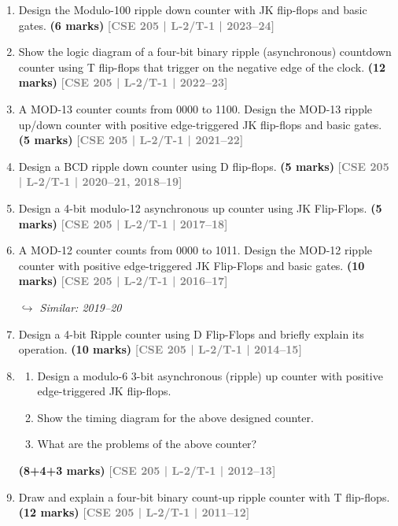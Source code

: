 \documentclass[12pt]{article}
\newcommand{\yr}[1]{\hfill\textcolor{gray}{\small\textbf{[#1]}}}
\newcommand{\mk}[1]{\textcolor{orange!70!black}{\small\textbf{(#1 marks)}}}
\newcommand{\variant}[1]{\par\vspace{1pt}\textcolor{blue!50!black}%
  {\footnotesize\textit{$\hookrightarrow$ Similar: #1}}}
\begin{document}
\begin{enumerate}

\item Design the Modulo-100 ripple down counter with JK flip-flops and basic gates.
\mk{6} \yr{CSE 205 | L-2/T-1 | 2023--24}

\item Show the logic diagram of a four-bit binary ripple (asynchronous) countdown counter using T flip-flops that trigger on the negative edge of the clock.
\mk{12} \yr{CSE 205 | L-2/T-1 | 2022--23}

\item A MOD-13 counter counts from 0000 to 1100. Design the MOD-13 ripple up/down counter with positive edge-triggered JK flip-flops and basic gates.
\mk{5} \yr{CSE 205 | L-2/T-1 | 2021--22}

\item Design a BCD ripple down counter using D flip-flops.
\mk{5} \yr{CSE 205 | L-2/T-1 | 2020--21, 2018--19}

\item Design a 4-bit modulo-12 asynchronous up counter using JK Flip-Flops.
\mk{5} \yr{CSE 205 | L-2/T-1 | 2017--18}

\item A MOD-12 counter counts from 0000 to 1011. Design the MOD-12 ripple counter with positive edge-triggered JK Flip-Flops and basic gates.
\mk{10} \yr{CSE 205 | L-2/T-1 | 2016--17}
\variant{2019--20}

\item Design a 4-bit Ripple counter using D Flip-Flops and briefly explain its operation.
\mk{10} \yr{CSE 205 | L-2/T-1 | 2014--15}

\item
\begin{enumerate}
  \item Design a modulo-6 3-bit asynchronous (ripple) up counter with positive edge-triggered JK flip-flops.
  \item Show the timing diagram for the above designed counter.
  \item What are the problems of the above counter?

\end{enumerate}
\mk{8+4+3} \yr{CSE 205 | L-2/T-1 | 2012--13}

\item Draw and explain a four-bit binary count-up ripple counter with T flip-flops.
\mk{12} \yr{CSE 205 | L-2/T-1 | 2011--12}

\end{enumerate}
\end{document}

